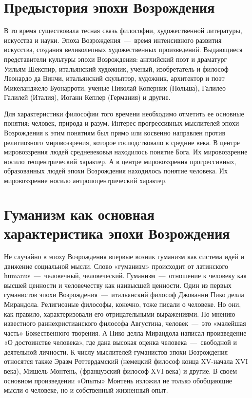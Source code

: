 \documentclass[14pt]{extarticle}
\begin{document}
\section{Предыстория эпохи Возрождения}

В то время существовала тесная связь философии, художественной литературы, искусства и науки. Эпоха Возрождения~---~время интенсивного развития искусства, создания великолепных художественных произведений. Выдающиеся представители культуры эпохи Возрождения: английский поэт и драматург Уильям Шекспир, итальянский художник, ученый, изобретатель и философ Леонардо да Винчи, итальянский скульптор, художник, архитектор и поэт Микеланджело Буонарроти, ученые Николай Коперник (Польша), Галилео Галилей (Италия), Иоганн Кеплер (Германия) и другие.

Для характеристики философии того времени необходимо отметить ее основные понятия: человек, природа и разум. Интерес прогрессивных мыслителей эпохи Возрождения к этим понятиям был прямо или косвенно направлен против религиозного мировоззрения, которое господствовало в средние века. В центре мировоззрения людей средневековья находилось понятие Бога. Их мировоззрение носило теоцентрический характер. А в центре мировоззрения прогрессивных, образованных людей эпохи Возрождения находилось понятие человека. Их мировоззрение носило антропоцентрический характер.

\section{Гуманизм как основная характеристика эпохи Возрождения}

Не случайно в эпоху Возрождения впервые возник гуманизм как система идей и движение социальной мысли. Слово «гуманизм» происходит от латинского humanus~---~человечный, человеческий. Гуманизм~---~отношение к человеку как высшей ценности и человечеству как наивысшей ценности. Один из первых гуманистов эпохи Возрождения~---~итальянский философ Джованни Пико делла Мирандола. Религиозные философы, конечно, тоже писали о человеке. Но они, как правило, характеризовали его отрицательными выражениями. По мнению известного раннехристианского философа Августина, человек~---~это «малейшая часть» Божественного творения. А Пико делла Мирандола написал произведение «О достоинстве человека», где дана высокая оценка человека~---~свободной и деятельной личности. К числу мыслителей-гуманистов эпохи Возрождения относятся также Эразм Роттердамский (немецкий философ конца XV-начала XVI века), Мишель Монтень, (французский философ XVI века) и другие. В своем основном произведении «Опыты» Монтень изложил не только обобщающие мысли о человеке, но и собственный жизненный опыт.
\end{document}
